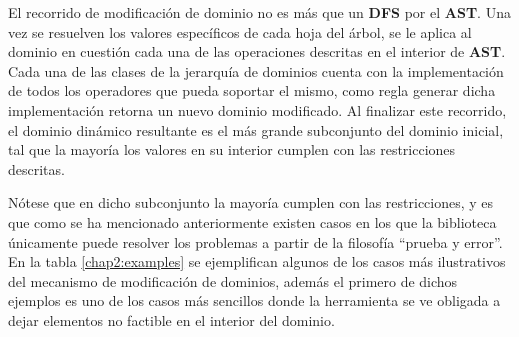 El recorrido de modificación de dominio no es más que un {\bf DFS} por el {\bf AST}. Una vez se resuelven los valores específicos de cada
hoja del árbol, se le aplica al dominio en cuestión cada una de las operaciones descritas en el interior de {\bf AST}. Cada una de
las clases de la jerarquía de dominios cuenta con la implementación de todos los operadores que pueda soportar el mismo, como
regla generar dicha implementación retorna un nuevo dominio modificado. Al finalizar este recorrido, el dominio dinámico
resultante es el más grande subconjunto del dominio inicial, tal que la mayoría los valores en su interior cumplen con las
restricciones descritas.

Nótese que en dicho subconjunto la mayoría cumplen con las restricciones, y es que como se ha mencionado anteriormente existen
casos en los que la biblioteca únicamente puede resolver los problemas a partir de la filosofía “prueba y error”. En la 
tabla \ref{chap2:examples} se ejemplifican algunos de los casos más ilustrativos del mecanismo de modificación de dominios, además el primero de dichos
ejemplos es uno de los casos más sencillos donde la herramienta se ve obligada a dejar elementos no factible en el interior del
dominio.

